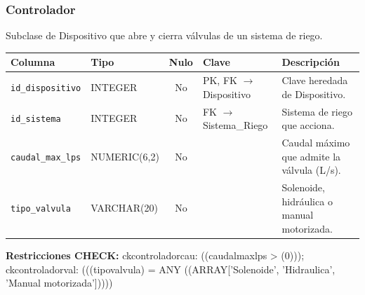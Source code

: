 \documentclass[11pt,letterpaper]{article}
\newcommand{\tbus}{\textunderscore\allowbreak}
\newcommand{\tb}[1]{{\ttfamily\let\_\tbus #1}}
\begin{document}
\subsubsection*{Controlador}
Subclase de Dispositivo que abre y cierra válvulas de un sistema de riego.
{\footnotesize
\begin{longtable}{>{\raggedright\arraybackslash}p{3.3cm}>{\raggedright\arraybackslash}p{2.5cm}c>{\raggedright\arraybackslash}p{2.2cm}>{\raggedright\arraybackslash}p{6.1cm}}
\toprule
\textbf{Columna} & \textbf{Tipo} & \textbf{Nulo} & \textbf{Clave} & \textbf{Descripción} \\
\midrule
\endhead
\texttt{id\_dispositivo} & INTEGER & No & PK, FK $\to$ Dispositivo & Clave heredada de Dispositivo. \\
\texttt{id\_sistema} & INTEGER & No & FK $\to$ Sistema\_Riego & Sistema de riego que acciona. \\
\texttt{caudal\_max\_lps} & NUMERIC(6,2) & No &  & Caudal máximo que admite la válvula (L/s). \\
\texttt{tipo\_valvula} & VARCHAR(20) & No &  & Solenoide, hidráulica o manual motorizada. \\
\bottomrule
\end{longtable}}
{\footnotesize\raggedright\textbf{Restricciones CHECK:} \tb{ck\_controlador\_cau}: \tb{((caudal\_max\_lps > (0)))}; \tb{ck\_controlador\_val}: \tb{(((tipo\_valvula) = ANY ((ARRAY['Solenoide', 'Hidraulica', 'Manual motorizada']))))}\par}
\medskip
\end{document}
